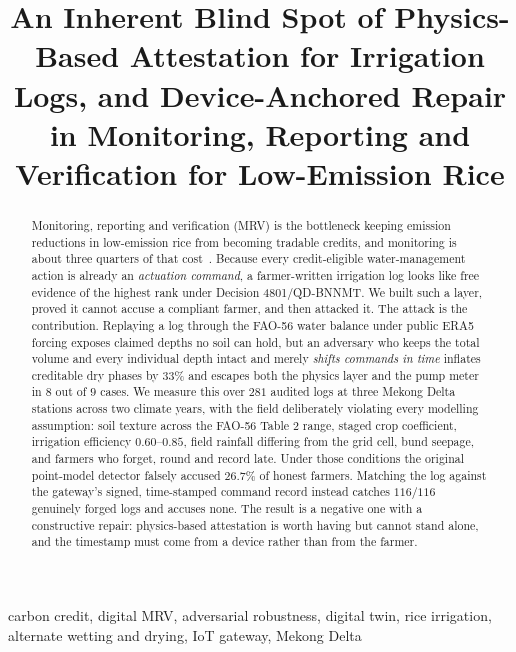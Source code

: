 \title{An Inherent Blind Spot of Physics-Based Attestation for Irrigation Logs,
  and Device-Anchored Repair in Monitoring, Reporting and Verification for
  Low-Emission Rice}

\begin{abstract}
Monitoring, reporting and verification (MRV) is the bottleneck keeping emission
reductions in low-emission rice from becoming tradable credits, and monitoring is
about three quarters of that cost~\cite{jem2026mrv}. Because every credit-eligible water-management
action is already an \emph{actuation command}, a farmer-written irrigation log
looks like free evidence of the highest rank under Decision 4801/QD-BNNMT. We
built such a layer, proved it cannot accuse a compliant farmer, and then attacked
it. The attack is the contribution. Replaying a log through the FAO-56 water
balance under public ERA5 forcing exposes claimed depths no soil can hold, but
an adversary who keeps the total volume and every individual depth intact and
merely \emph{shifts commands in time} inflates creditable dry phases by
$33\%$ and escapes both the physics layer and the pump meter in $8$ out of $9$ cases.
We measure this over $281$ audited logs at three Mekong Delta stations across two
climate years, with the field deliberately violating every modelling assumption:
soil texture across the FAO-56 Table 2 range, staged crop coefficient,
irrigation efficiency $0.60$--$0.85$, field rainfall differing from the grid
cell, bund seepage, and farmers who forget, round and record late. Under those
conditions the original point-model detector falsely accused $26.7\%$ of honest
farmers. Matching the log against the gateway's signed, time-stamped command
record instead catches $116/116$ genuinely forged logs and accuses none. The
result is a negative one with a constructive repair: physics-based attestation is
worth having but cannot stand alone, and the timestamp must come from a device
rather than from the farmer.
\end{abstract}

\begin{IEEEkeywords}
carbon credit, digital MRV, adversarial robustness, digital twin, rice irrigation,
alternate wetting and drying, IoT gateway, Mekong Delta
\end{IEEEkeywords}
